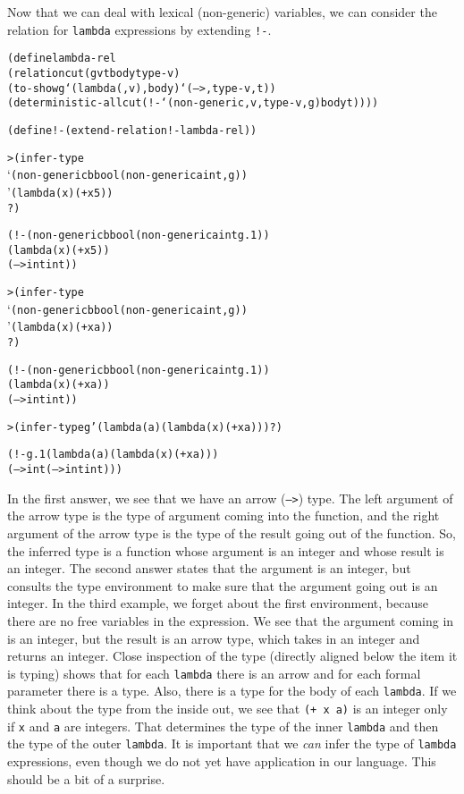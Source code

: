 Now that we can deal with lexical (non-generic) variables, we can
consider the relation for \texttt{lambda} expressions by extending
\texttt{!-}.

\begin{alltt}
(define lambda-rel
  (relation cut (g v t body type-v)
    (to-show g `(lambda (,v) ,body) `(--> ,type-v ,t))
    (deterministic-all cut (!- `(non-generic ,v ,type-v ,g) body t))))

(define !- (extend-relation !- lambda-rel))
\end{alltt}
\newpage
\begin{alltt}
> (infer-type 
    `(non-generic b bool (non-generic a int ,g))
    '(lambda (x) (+ x 5))
    ?)

(!- (non-generic b bool (non-generic a int g.1))
    (lambda (x) (+ x 5))
    (--> int int))
\end{alltt}

\begin{alltt}
> (infer-type
    `(non-generic b bool (non-generic a int ,g))
    '(lambda (x) (+ x a))
    ?)

(!- (non-generic b bool (non-generic a int g.1))
    (lambda (x) (+ x a))
    (--> int int))
\end{alltt}

\begin{alltt}
> (infer-type g '(lambda (a) (lambda (x) (+ x a))) ?)

(!- g.1 (lambda (a) (lambda (x) (+ x a)))
         (--> int (--> int int)))
\end{alltt}

In the first answer, we see that we have an arrow (\texttt{-->})
type.  The left argument of the arrow type is the type of argument
coming into the function, and the right argument of the arrow type is
the type of the result going out of the function.  So, the inferred
type is a function whose argument is an integer and whose result is an
integer.  The second answer states that the argument is an integer,
but consults the type environment to make sure that the argument going
out is an integer.  In the third example, we forget about the first
environment, because there are no free variables in the expression. We
see that the argument coming in is an integer, but the result is an
arrow type, which takes in an integer and returns an integer.  Close
inspection of the type (directly aligned below the item it is typing)
shows that for each \texttt{lambda} there is an arrow and for each
formal parameter there is a type.  Also, there is a type for the body
of each \texttt{lambda}.  If we think about the type from the inside
out, we see that \texttt{(+ x a)} is an integer only if \texttt{x} and
\texttt{a} are integers.  That determines the type of the inner
\texttt{lambda} and then the type of the outer \texttt{lambda}.  It is
important that we \emph{can} infer the type of \texttt{lambda}
expressions, even though we do not yet have application in our language.
This should be a bit of a surprise.

